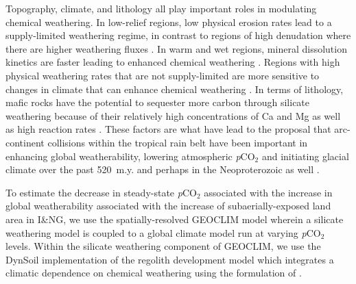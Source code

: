 \documentclass[11pt,letterpaper]{article}
\newcommand{\pCOtwo}{\textit{p}CO$_{2}$\xspace}
\begin{document}
Topography, climate, and lithology all play important roles in modulating chemical weathering. In low-relief regions, low physical erosion rates lead to a supply-limited weathering regime, in contrast to regions of high denudation where there are higher weathering fluxes \citep{Gabet2009a, West2012a, Maher2014a}. In warm and wet regions, mineral dissolution kinetics are faster leading to enhanced chemical weathering \citep{Lasaga1994a, West2012a}. Regions with high physical weathering rates that are not supply-limited are more sensitive to changes in climate that can enhance chemical weathering \citep{West2012a, Maher2014a}. In terms of lithology, mafic rocks have the potential to sequester more carbon through silicate weathering because of their relatively high concentrations of Ca and Mg as well as high reaction rates \citep{Dessert2003a}. These factors are what have lead to the proposal that arc-continent collisions within the tropical rain belt have been important in enhancing global weatherability, lowering atmospheric \pCOtwo and initiating glacial climate over the past 520~m.y. \citep{Jagoutz2016a, Swanson-Hysell2017a, Macdonald2019a} and perhaps in the Neoproterozoic as well \citep{Park2019a}.

To estimate the decrease in steady-state \pCOtwo associated with the increase in global weatherability associated with the increase of subaerially-exposed land area in I\&NG, we use the spatially-resolved GEOCLIM model \citep{Godderis2014a, Godderis2017c} wherein a silicate weathering model is coupled to a global climate model run at varying \pCOtwo levels. Within the silicate weathering component of GEOCLIM, we use the DynSoil implementation of the \citet{Gabet2009a} regolith development model which integrates a climatic dependence on chemical weathering using the formulation of \cite{West2012a}.
\end{document}
